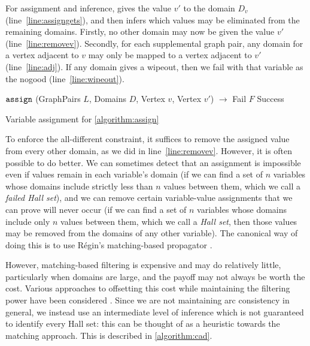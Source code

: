 \documentclass{llncs}
\newcommand{\lineref}[1]{line~\ref{#1}}
\begin{document}
For assignment and inference,  gives the value $v'$ to the domain $D_v$
(\lineref{line:assigngets}), and then infers which values may be eliminated from the remaining
domains.  Firstly, no other domain may now be given the value $v'$ (\lineref{line:removev}).
Secondly, for each supplemental graph pair, any domain for a vertex adjacent to $v$ may only be
mapped to a vertex adjacent to $v'$ (\lineref{line:adj}). If any domain gives a wipeout, then we
fail with that variable as the nogood (\lineref{line:wipeout}).

\begin{algorithm}[h]
\DontPrintSemicolon
\nl $\FuncSty{assign}$ (GraphPairs $L$, Domains $D$, Vertex $v$, Vertex $v'$) $\rightarrow$ Fail $F$  Success \;
\nl {}
\caption{Variable assignment for \cref{algorithm:assign}}
\label{algorithm:assign}
\end{algorithm}

To enforce the all-different constraint, it suffices to remove the assigned value from every other
domain, as we did in \lineref{line:removev}. However, it is often possible to do better. We can
sometimes detect that an assignment is impossible even if values remain in each variable's domain
(if we can find a set of $n$ variables whose domains include strictly less than $n$ values between
them, which we call a \emph{failed Hall set}), and we can remove certain variable-value assignments
that we can prove will never occur (if we can find a set of $n$ variables whose domains include only
$n$ values between them, which we call a \emph{Hall set}, then those values may be removed from the
domains of any other variable). The canonical way of doing this is to use R\'egin's matching-based
propagator \cite{Regin:1994}.

However, matching-based filtering is expensive and may do relatively little, particularly when
domains are large, and the payoff may not always be worth the cost. Various approaches to offsetting
this cost while maintaining the filtering power have been considered \cite{Gent:2008}. Since we are
not maintaining arc consistency in general, we instead use an intermediate level of inference which
is not guaranteed to identify every Hall set: this can be thought of as a heuristic towards the
matching approach. This is described in \cref{algorithm:cad}.
\end{document}
